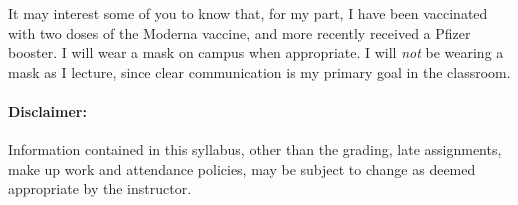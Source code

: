 \documentclass[12pt, letterpaper]{article}
\begin{document}
\noindent It may interest some of you to know that, for my part, I have been vaccinated with two doses of the Moderna vaccine, and more recently received a Pfizer booster. I will wear a mask on campus when appropriate. I will \emph{not} be wearing a mask as I lecture, since clear communication is my primary goal in the classroom.

\paragraph{Disclaimer:}
Information contained in this syllabus, other than the grading, late assignments, make up work and attendance policies, may be subject to change as deemed appropriate by the instructor.
\end{document}
